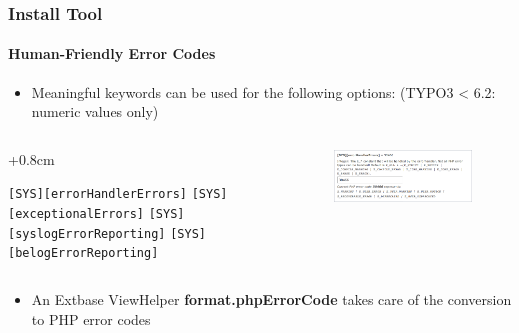 
\begin{frame}[fragile]
	\frametitle{Install Tool}
	\framesubtitle{Human-Friendly Error Codes}

	\begin{itemize}
		\item Meaningful keywords can be used for the following options:\newline
			(TYPO3 < 6.2: numeric values only)
	\end{itemize}

	\begin{columns}[T]
		\begin{column}{.4\textwidth}
			\advance\leftskip+0.8cm

			\smaller
				\texttt{[SYS][errorHandlerErrors]}\newline
				\texttt{[SYS][exceptionalErrors]}\newline
				\texttt{[SYS][syslogErrorReporting]}\newline
				\texttt{[SYS][belogErrorReporting]}\newline
			\normalsize

		\end{column}
		\begin{column}{.6\textwidth}

			\begin{figure}\vspace*{-0.4cm}
				\includegraphics[width=0.9\linewidth]{Images/InstallTool/HumanFriendlyErrorCodes.png}
			\end{figure}

		\end{column}
	\end{columns}

	\vspace{0.2cm}

	\begin{itemize}
		\item An Extbase ViewHelper \textbf{format.phpErrorCode} takes care of the conversion to PHP error codes
	\end{itemize}

\end{frame}

